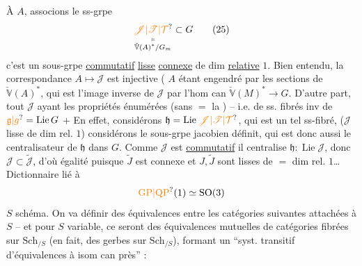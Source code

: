 À  $A$, associons le ss-grpe
\[
 \underset{\substack{\shortparallel\\\check{\mathbb V}(A)^*/G_m}}{\unsure{\mathscr J|\mathscr T|\mathcal T}}\subset G\tag*{(25)}
\]
c'est un sous-grpe \uline{commutatif} \uline{lisse} \uline{connexe} de dim \uline{relative} $1$. Bien entendu, la correspondance $A\mapsto\mathscr J$ est injective ( $A$ étant engendré par  les sections de $\check{\mathbb V}(A)^*$, qui est l'image inverse de $\mathscr J$ par l'hom can $\check{\mathbb V}(M)^*\longrightarrow G$.
D'autre part,  tout $\mathscr J$ ayant les propriétés énumérées (sans $=$ la )  -- i.e. de ss. fibrés inv
de $\unsure{\mathfrak g|g}=\operatorname{Lie}G$ $+$  En effet, considérons $\mathfrak h=\operatorname{Lie}\unsure{\mathscr J|\mathscr T|\mathcal T}$, qui est un tel ss-fibré, ($\mathscr J$ lisse de dim rel. $1$)
considérons le  sous-grpe jacobien  définit, qui est donc aussi le centralisateur de $\mathfrak h$ dans $G$.
 Comme $\mathscr J$ est \uline{commutatif} il centralise $\mathfrak h:\operatorname{Lie}\mathscr J$, donc $\mathscr J\subset\widetilde{\mathscr J}$, d'où égalité puisque $\widetilde J$ est connexe et $J,\widetilde J$ sont lisses de $=$ dim rel. $1$\ldots
Dictionnaire lié à
\[
 \mathrm{\unsure{GP|QP}}(1)\simeq\mathrm{SO}(3)
\]
$S$ schéma. On va définir des équivalences entre les  catégories suivantes attachées à $S$ -- et pour $S$ variable, ce seront des équivalences mutuelles de catégories fibrées sur $\mathrm{Sch}_{/S}$ (en fait, des gerbes  sur $\mathrm{Sch}_{/S}$), formant un ``syst. transitif d'équivalences à isom can près'' :
